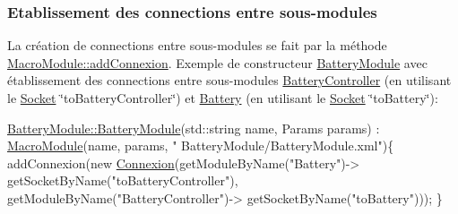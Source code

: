 \hypertarget{docMacroModule_connectSubModules}{}\subsubsection{Etablissement des connections entre sous-\/modules}\label{docMacroModule_connectSubModules}
La création de connections entre sous-\/modules se fait par la méthode \hyperlink{classMacroModule_a6ad4d6abd8bb4b742b800f6fa3c98296}{Macro\-Module\-::add\-Connexion}. Exemple de constructeur \hyperlink{classBatteryModule}{Battery\-Module} avec établissement des connections entre sous-\/modules \hyperlink{classBatteryController}{Battery\-Controller} (en utilisant le \hyperlink{classSocket}{Socket} \char`\"{}to\-Battery\-Controller\char`\"{}) et \hyperlink{classBattery}{Battery} (en utilisant le \hyperlink{classSocket}{Socket} \char`\"{}to\-Battery\char`\"{})\-: 
\begin{DoxyCode}
\hyperlink{classBatteryModule_a2fb494ef5f124c38c0fdf9ccfb31918f}{BatteryModule::BatteryModule}(std::string name, 
      Params params) : \hyperlink{classMacroModule}{MacroModule}(name, params, \textcolor{stringliteral}{"
      BatteryModule/BatteryModule.xml"})\{
     addConnexion(\textcolor{keyword}{new} \hyperlink{classConnexion}{Connexion}(getModuleByName(\textcolor{stringliteral}{"Battery"})->
      getSocketByName(\textcolor{stringliteral}{"toBatteryController"}), getModuleByName(\textcolor{stringliteral}{"BatteryController"})->
      getSocketByName(\textcolor{stringliteral}{"toBattery"})));
\}
\end{DoxyCode}
 